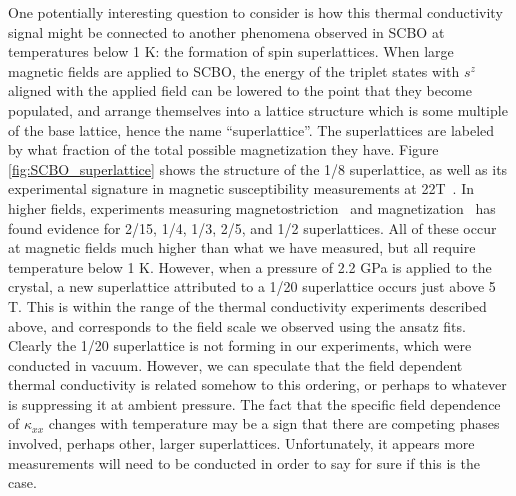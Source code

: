 \documentclass{thesis-umich}
\begin{document}
One potentially interesting question to consider is how this thermal conductivity signal might be connected to another phenomena observed in SCBO at temperatures below 1 K: the formation of spin superlattices. When large magnetic fields are applied to SCBO, the energy of the triplet states with $s^z$ aligned with the applied field can be lowered to the point that they become populated, and arrange themselves into a lattice structure which is some multiple of the base lattice, hence the name ``superlattice''. The superlattices are labeled by what fraction of the total possible magnetization they have. Figure \ref{fig:SCBO_superlattice} shows the structure of the 1/8 superlattice, as well as its experimental signature in magnetic susceptibility measurements at 22T~\cite{Haravifard2016}. In higher fields, experiments measuring magnetostriction~\cite{Jaime2012} and magnetization~\cite{Matsuda2013} has found evidence for 2/15, 1/4, 1/3, 2/5, and 1/2 superlattices. All of these occur at magnetic fields much higher than what we have measured, but all require temperature below 1 K. However, when a pressure of 2.2 GPa is applied to the crystal, a new superlattice attributed to a 1/20 superlattice occurs just above 5 T. This is within the range of the thermal conductivity experiments described above, and corresponds to the field scale we observed using the ansatz fits. Clearly the 1/20 superlattice is not forming in our experiments, which were conducted in vacuum. However, we can speculate that the field dependent thermal conductivity is related somehow to this ordering, or perhaps to whatever is suppressing it at ambient pressure. The fact that the specific field dependence of $\kappa_{xx}$ changes with temperature may be a sign that there are competing phases involved, perhaps other, larger superlattices. Unfortunately, it appears more measurements will need to be conducted in order to say for sure if this is the case. 
\end{document}
